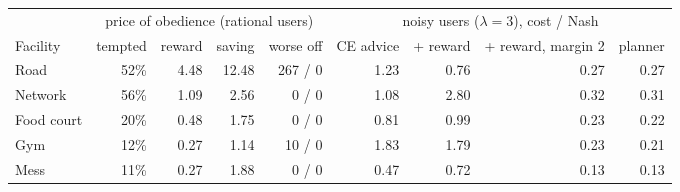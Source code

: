 \begin{tabular}{@{}lrrrrrrrr@{}}\toprule
 & \multicolumn{4}{c}{price of obedience (rational users)} & \multicolumn{4}{c}{noisy users ($\lambda=3$), cost / Nash}\\
\cmidrule(lr){2-5}\cmidrule(l){6-9}
Facility & tempted & reward & saving & worse off & CE advice & + reward & + reward, margin 2 & planner\\\midrule
Road & 52\% & 4.48 & 12.48 & 267 / 0 & 1.23 & 0.76 & 0.27 & 0.27\\
Network & 56\% & 1.09 & 2.56 & 0 / 0 & 1.08 & 2.80 & 0.32 & 0.31\\
Food court & 20\% & 0.48 & 1.75 & 0 / 0 & 0.81 & 0.99 & 0.23 & 0.22\\
Gym & 12\% & 0.27 & 1.14 & 10 / 0 & 1.83 & 1.79 & 0.23 & 0.21\\
Mess & 11\% & 0.27 & 1.88 & 0 / 0 & 0.47 & 0.72 & 0.13 & 0.13\\
\bottomrule
\end{tabular}
